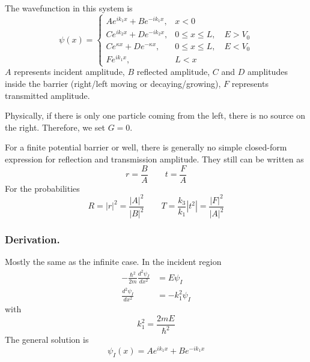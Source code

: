 \documentclass[../../../main.tex]{subfiles}
\begin{document}
The wavefunction in this system is
\begin{equation*}
    \psi(x) =
    \begin{cases}
        A e^{i k_1 x} + B e^{-i k_1 x},   & x < 0                        \\[1mm]
        C e^{i k_2 x} + D e^{-i k_2 x},   & 0 \le x \le L, \quad E > V_0 \\[1mm]
        C e^{\kappa x} + D e^{-\kappa x}, & 0 \le x \le L, \quad E < V_0 \\[1mm]
        F e^{i k_1 x},                    & L<x
    \end{cases}
\end{equation*}
$A$ represents incident amplitude, $B$ reflected amplitude, $C$ and $D$ amplitudes inside the barrier (right/left moving or decaying/growing), $F$ represents transmitted amplitude.

Physically, if there is only one particle coming from the left, there is no source on the right.
Therefore, we set $G=0$.

For a finite potential barrier or well, there is generally no simple closed-form expression for reflection and transmission amplitude.
They still can be written as
\begin{equation*}
    r=\frac{B }{A }\qquad t=\frac{F }{A}
\end{equation*}
For the probabilities
\begin{equation*}
    R=|r|^2=\frac{|A|^2}{|B|^2}\qquad T=\frac{k_3 }{k_1 }|t^2|=\frac{|F|^2}{|A|^2}
\end{equation*}
\subsubsection{Derivation.}
Mostly the same as the infinite case.
In the incident region
\begin{align*}
    -\frac{\hbar^2}{2m} \frac{d^2 \psi_{I}}{dx^2} & =  E \psi_I        \\
    \frac{d^2 \psi_{I}}{dx^2}                     & = - k_1^2 \psi_{I}
\end{align*}
with
\begin{equation*}
    k_1^2 =\frac{2 m E}{\hbar^2}
\end{equation*}
The general solution is
\begin{equation*}
    \psi_I(x) = A e^{i k_1 x} + B e^{-i k_1 x}
\end{equation*}
\end{document}
